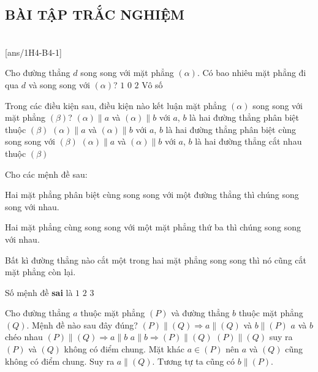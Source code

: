 \NOTE
\subsection{BÀI TẬP TRẮC NGHIỆM}
 \\
\setcounter{ex}{0}
[ans/1H4-B4-1]
\begin{ex}%
	Cho đường thẳng $d$ song song với mặt phẳng $(\alpha  )$. Có bao nhiêu mặt phẳng đi qua $d$ và song song với $(\alpha  )$?
	\choice
	{\True $1$}
	{$0$}
	{$2$}
	{Vô số}
	\loigiai{}
\end{ex}

\begin{ex}%
	Trong các điều kiện sau, điều kiện nào kết luận mặt phẳng $(\alpha  )$ song song với mặt phẳng $(\beta )$?
	{$(\alpha )\parallel a$ và $(\alpha )\parallel b$ với $a$, $b$ là hai đường thẳng phân biệt thuộc $(\beta )$}
	{$(\alpha )\parallel a$ và $(\alpha )\parallel b$ với $a$, $b$ là hai đường thẳng phân biệt cùng song song với $(\beta )$}
	{\True $(\alpha )\parallel a$ và $(\alpha )\parallel b$ với $a$, $b$ là hai đường thẳng cắt nhau thuộc $(\beta )$} 
\end{ex}

\begin{ex}%
	Cho các mệnh đề sau:
	\begin{listEX}[1]
		\item [\ding{172}] Hai mặt phẳng phân biệt cùng song song với một đường thẳng thì chúng song song với nhau.
		\item [\ding{173}] Hai mặt phẳng cùng song song với một mặt phẳng thứ ba thì chúng song song với  nhau.
		\item [\ding{174}] Bất kì đường thẳng nào cắt một trong hai mặt phẳng song song thì nó cũng cắt mặt phẳng còn lại.
	\end{listEX}
	Số mệnh đề \textbf{sai} là
	{$1$}
	{\True $2$}
	{$3$}
\end{ex}

\begin{ex}%
	Cho đường thẳng $a$ thuộc mặt phẳng $(P)$ và đường thẳng $b$ thuộc mặt phẳng $(Q)$. Mệnh đề nào sau đây đúng?
	\choice
	{\True $(P)\parallel (Q)\Rightarrow a\parallel (Q)$ và $b\parallel (P)$}
	{$a$ và $b$ chéo nhau}
	{$(P)\parallel (Q)\Rightarrow a\parallel b$}
	{$a\parallel b\Rightarrow (P)\parallel (Q)$}
	\loigiai
	{
		$(P)\parallel (Q)$ suy ra $(P)$ và $(Q)$ không có điểm chung. Mặt khác $a\in (P)$ nên $a$ và $(Q)$ cũng không có điểm chung. Suy ra $a\parallel (Q)$. Tương tự ta cũng có $b\parallel (P)$.
	}
\end{ex}

